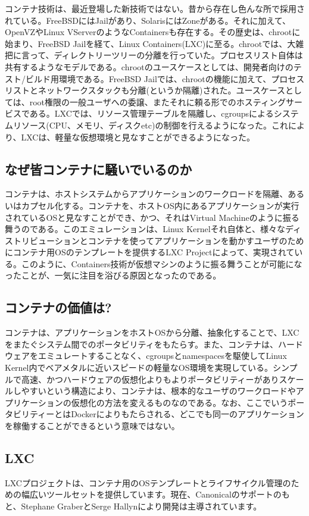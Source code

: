 \documentclass[9pt,b5paper,tombo]{jsbook}
\begin{document}
コンテナ技術は、最近登場した新技術ではない。昔から存在し色んな所で採用されている。FreeBSDにはJailがあり、SolarisにはZoneがある。それに加えて、OpenVZやLinux VServerのようなContainersも存在する。その歴史は、chrootに始まり、FreeBSD Jailを経て、Linux Containers(LXC)に至る。chrootでは、大雑把に言って、ディレクトリーツリーの分離を行っていた。プロセスリスト自体は共有するようなモデルである。chrootのユースケースとしては、開発者向けのテスト/ビルド用環境である。FreeBSD Jailでは、chrootの機能に加えて、プロセスリストとネットワークスタックも分離(というか隔離)された。ユースケースとしては、root権限の一般ユーザへの委譲、またそれに頼る形でのホスティングサービスである。LXCでは、リソース管理テーブルを隔離し、cgroupsによるシステムリソース(CPU、メモリ、ディスクetc)の制御を行えるようになった。これにより、LXCは、軽量な仮想環境と見なすことができるようになった。

\newpage

\subsection{なぜ皆コンテナに騒いでいるのか}
コンテナは、ホストシステムからアプリケーションのワークロードを隔離、あるいはカプセル化する。コンテナを、ホストOS内にあるアプリケーションが実行されているOSと見なすことができ、かつ、それはVirtual Machineのように振る舞うのである。このエミュレーションは、Linux Kernelそれ自体と、様々なディストリビューションとコンテナを使ってアプリケーションを動かすユーザのためにコンテナ用OSのテンプレートを提供するLXC Projectによって、実現されている。このように、Containers技術が仮想マシンのように振る舞うことが可能になったことが、一気に注目を浴びる原因となったのである。

\subsection{コンテナの価値は?}
コンテナは、アプリケーションをホストOSから分離、抽象化することで、LXCをまたぐシステム間でのポータビリティをもたらす。また、コンテナは、ハードウェアをエミュレートすることなく、cgroupsとnamespacesを駆使してLinux Kernel内でベアメタルに近いスピードの軽量なOS環境を実現している。シンプルで高速、かつハードウェアの仮想化よりもよりポータビリティーがありスケールしやすいという構造により、コンテナは、根本的なユーザのワークロードやアプリケーションの仮想化の方法を変えるものなのである。なお、ここでいうポータビリティーとはDockerによりもたらされる、どこでも同一のアプリケーションを稼働することができるという意味ではない。

\subsection{LXC}
LXCプロジェクトは、コンテナ用のOSテンプレートとライフサイクル管理のための幅広いツールセットを提供しています。現在、Canonicalのサポートのもと、Stephane GraberとSerge Hallynにより開発は主導されています。
\end{document}
